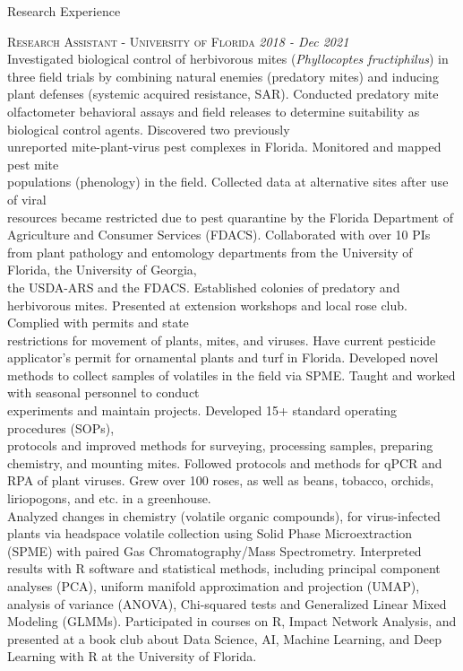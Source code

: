 \documentclass{resume} %
\begin{document}
\newpage

\begin{rSection}{Research Experience}

\textsc{Research Assistant - University of Florida} \hfill {\em \textit{2018 - Dec 2021}}\\  Investigated biological control of herbivorous mites (\textit{Phyllocoptes fructiphilus}) in three field trials by combining natural enemies (predatory mites) and inducing plant defenses (systemic acquired resistance, SAR). Conducted predatory mite olfactometer behavioral assays and field releases to determine suitability as biological control agents.
Discovered two previously\\ 
unreported mite-plant-virus pest complexes in Florida. Monitored and mapped pest mite\\
populations (phenology) in the field. Collected data at alternative sites after use of viral\\
resources became restricted due to pest quarantine by the Florida Department of Agriculture and Consumer Services (FDACS). Collaborated with over 10 PIs from plant pathology and entomology departments from the University of Florida, the University of Georgia,\\
the USDA-ARS and the FDACS. Established colonies of predatory and herbivorous mites. Presented at extension workshops and local rose club. Complied with permits and state\\
restrictions for movement of plants, mites, and viruses. Have current pesticide applicator's permit for ornamental plants and turf in Florida. Developed novel methods to collect samples of volatiles in the field via SPME. Taught and worked with seasonal personnel to conduct\\
experiments and maintain projects. Developed 15+ standard operating procedures (SOPs),\\
protocols and improved methods for surveying, processing samples, preparing chemistry, and mounting mites. Followed protocols and methods for qPCR and RPA of plant viruses. Grew over 100 roses, as well as beans, tobacco, orchids, liriopogons, and etc. in a greenhouse.\\
Analyzed changes in chemistry (volatile organic compounds), for virus-infected plants via headspace volatile collection using Solid Phase Microextraction (SPME) with paired Gas Chromatography/Mass Spectrometry. Interpreted results with R software and statistical methods, including principal component analyses (PCA), uniform manifold approximation and projection (UMAP), analysis of variance (ANOVA), Chi-squared tests and Generalized Linear Mixed Modeling (GLMMs). Participated in courses on R, Impact Network Analysis, and presented at a book club about Data Science, AI, Machine Learning, and Deep Learning with R at the University of Florida. \\
\hfill


\end{rSection}
\end{document}
